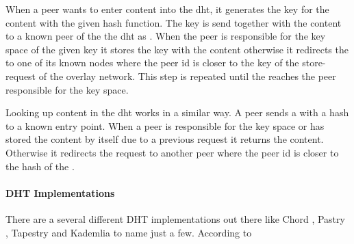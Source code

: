 When a peer wants to enter content into the \gls{dht}, it generates the key for the content with the given hash function. The key is send together with the content to a known peer of the the \gls{dht} as . When the peer is responsible for the key space of the given key it stores the key with the content otherwise it redirects the  to one of its known nodes where the peer id is closer to the key of the \gls{store-request} of the overlay network. This step is repeated until the  reaches the peer responsible for the key space.

Looking up content in the \gls{dht} works in a similar way. A peer sends a  with a hash to a known entry point. When a peer is responsible for the key space or has stored the content by itself due to a previous request it returns the content. Otherwise it redirects the request to another peer where the peer id is closer to the hash of the .

\paragraph{DHT Implementations}
There are a several different DHT implementations out there like Chord \cite{chord}, Pastry \cite{pastry}, Tapestry \cite{tapestry} and Kademlia \cite{kademlia} to name just a few.
According to \citet[]{tanenbaum_wetherall_2011} 

